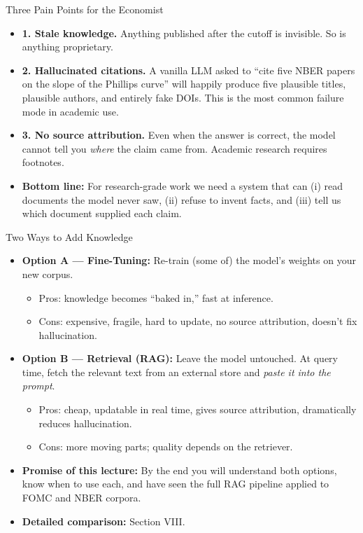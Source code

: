 \begin{frame}{Three Pain Points for the Economist}
\begin{itemize}
\item \textbf{1. Stale knowledge.} Anything published after the cutoff is invisible. So is anything proprietary.

\medskip
\item \textbf{2. Hallucinated citations.} A vanilla LLM asked to ``cite five NBER papers on the slope of the Phillips curve'' will happily produce five plausible titles, plausible authors, and entirely fake DOIs. This is the most common failure mode in academic use.

\medskip
\item \textbf{3. No source attribution.} Even when the answer is correct, the model cannot tell you \emph{where} the claim came from. Academic research requires footnotes.

\medskip
\item \textbf{Bottom line:} For research-grade work we need a system that can (i) read documents the model never saw, (ii) refuse to invent facts, and (iii) tell us which document supplied each claim.
\end{itemize}
\end{frame}

\begin{frame}{Two Ways to Add Knowledge}
\begin{itemize}
\item \textbf{Option A --- Fine-Tuning:} Re-train (some of) the model's weights on your new corpus.
\begin{itemize}
    \item Pros: knowledge becomes ``baked in,'' fast at inference.
    \item Cons: expensive, fragile, hard to update, no source attribution, doesn't fix hallucination.
\end{itemize}

\medskip
\item \textbf{Option B --- Retrieval (RAG):} Leave the model untouched. At query time, fetch the relevant text from an external store and \emph{paste it into the prompt}.
\begin{itemize}
    \item Pros: cheap, updatable in real time, gives source attribution, dramatically reduces hallucination.
    \item Cons: more moving parts; quality depends on the retriever.
\end{itemize}

\medskip
\item \textbf{Promise of this lecture:} By the end you will understand both options, know when to use each, and have seen the full RAG pipeline applied to FOMC and NBER corpora.

\medskip
\item \textbf{Detailed comparison:} Section VIII.
\end{itemize}
\end{frame}

